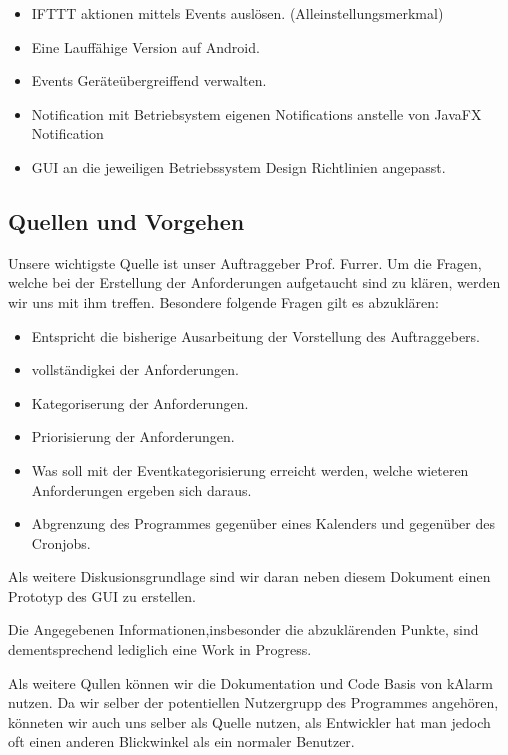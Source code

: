 \documentclass[11pt,titelpage]{scrreprt}
\begin{document}
\begin{itemize}
  
 \item IFTTT aktionen mittels Events auslösen.  (Alleinstellungsmerkmal)
 \item  Eine Lauffähige Version auf Android.
 \item  Events Geräteübergreiffend verwalten.
 \item Notification mit Betriebsystem eigenen Notifications anstelle von JavaFX Notification
 \item GUI an die jeweiligen Betriebssystem Design Richtlinien angepasst.
 

 
\end{itemize}







\subsection{Quellen und Vorgehen}
Unsere wichtigste Quelle ist unser Auftraggeber Prof. Furrer. Um die Fragen, welche bei der Erstellung der Anforderungen aufgetaucht sind zu klären, werden wir uns mit ihm treffen.
Besondere folgende Fragen gilt es abzuklären:

\begin{itemize}
\item Entspricht die bisherige Ausarbeitung der Vorstellung des Auftraggebers.
\item vollständigkei der Anforderungen.
\item Kategoriserung der Anforderungen.
\item Priorisierung der Anforderungen.
\item Was soll mit der Eventkategorisierung erreicht werden, welche wieteren Anforderungen ergeben sich daraus.
\item Abgrenzung des Programmes gegenüber eines Kalenders und gegenüber des Cronjobs.
\end{itemize}
Als weitere Diskusionsgrundlage sind wir daran neben diesem Dokument einen Prototyp des GUI zu erstellen.


Die Angegebenen Informationen,insbesonder die abzuklärenden Punkte, sind dementsprechend lediglich eine Work in Progress.


Als weitere Qullen können wir die Dokumentation und Code Basis von kAlarm nutzen. 
Da wir selber der potentiellen Nutzergrupp des Programmes angehören, könneten wir auch uns selber als Quelle nutzen, als Entwickler hat man jedoch oft einen anderen Blickwinkel als ein normaler Benutzer.
\end{document}
